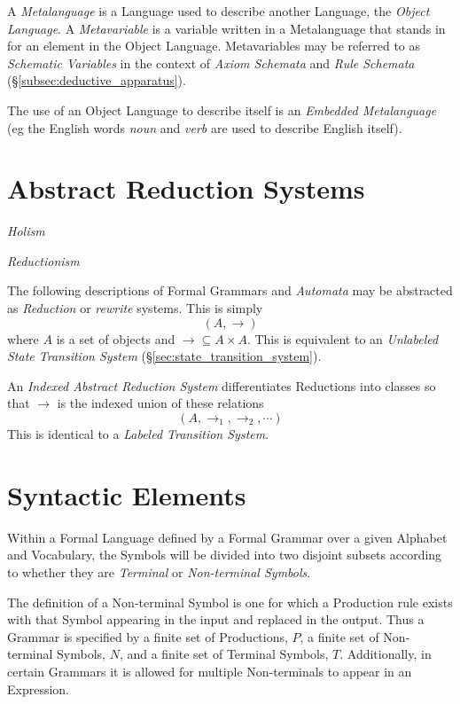 \documentclass{article}
\begin{document}
A \emph{Metalanguage} is a Language used to describe another Language,
the \emph{Object Language}. A \emph{Metavariable} is a variable
written in a Metalanguage that stands in for an element in the Object
Language. Metavariables may be referred to as \emph{Schematic
  Variables} in the context of \emph{Axiom Schemata} and \emph{Rule
  Schemata} (\S \ref{subsec:deductive_apparatus}).

The use of an Object Language to describe itself is an \emph{Embedded
  Metalanguage} (eg the English words \emph{noun} and \emph{verb} are
used to describe English itself).



\section{Abstract Reduction Systems}\label{sec:abstract_rewrite}

\emph{Holism}

\emph{Reductionism}

The following descriptions of Formal Grammars and \emph{Automata} may
be abstracted as \emph{Reduction} or \emph{rewrite} systems. This is
simply
    \[(A,\rightarrow)\]
where $A$ is a set of objects and $\rightarrow \subseteq A \times
A$. This is equivalent to an \emph{Unlabeled State Transition System}
(\S\ref{sec:state_transition_system}).

An \emph{Indexed Abstract Reduction System} differentiates Reductions
into classes so that $\rightarrow$ is the indexed union of these
relations
    \[(A, \rightarrow_1, \rightarrow_2, \cdots)\]
This is identical to a \emph{Labeled Transition System}.



\section{Syntactic Elements}

Within a Formal Language defined by a Formal Grammar over a given
Alphabet and Vocabulary, the Symbols will be divided into two disjoint
subsets according to whether they are \emph{Terminal} or
\emph{Non-terminal Symbols}.

The definition of a Non-terminal Symbol is one for which a Production
rule exists with that Symbol appearing in the input and replaced in
the output. Thus a Grammar is specified by a finite set of
Productions, $P$, a finite set of Non-terminal Symbols, $N$, and a
finite set of Terminal Symbols, $T$. Additionally, in certain Grammars
it is allowed for multiple Non-terminals to appear in an Expression.
\end{document}
